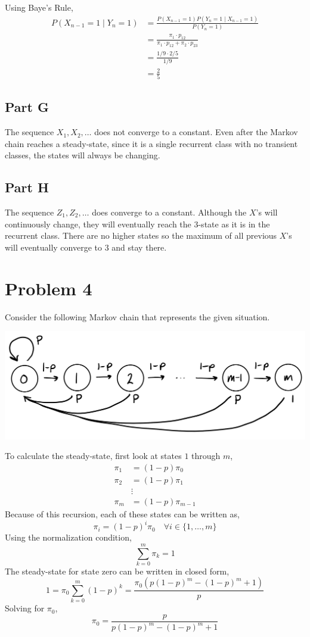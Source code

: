 \documentclass{article}
\begin{document}
Using Baye's Rule,
\begin{align*}
  P(X_{n - 1} = 1 \mid Y_n = 1) &= \frac{P(X_{n - 1} = 1) P(Y_n = 1 \mid X_{n
  - 1} = 1)}{P(Y_n = 1)} \\
  &= \frac{\pi_1 \cdot p_{12}}{\pi_1 \cdot p_{12} + \pi_2 \cdot p_{23}} \\
  &= \frac{1/9 \cdot 2/5}{1/9} \\
  &= \frac{2}{5}
\end{align*}

\subsection*{Part G}

The sequence $X_1, X_2, \ldots$ does not converge to a constant. Even after
the Markov chain reaches a steady-state, since it is a single recurrent class
with no transient classes, the states will always be changing.

\subsection*{Part H}

The sequence $Z_1, Z_2, \ldots$ does converge to a constant. Although the
$X$'s will continuously change, they will eventually reach the $3$-state as
it is in the recurrent class. There are no higher states so the maximum of
all previous $X$'s will eventually converge to $3$ and stay there.

\section*{Problem 4}

Consider the following Markov chain that represents the given situation.

\begin{center}
    \includegraphics[scale=0.25]{Images/P4.PNG}
\end{center}

To calculate the steady-state, first look at states $1$ through $m$,
\begin{align*}
  \pi_1 &= (1 - p) \pi_0 \\
  \pi_2 &= (1 - p) \pi_1 \\
  &\vdots \\
  \pi_m &= (1 - p) \pi_{m - 1}
\end{align*}
Because of this recursion, each of these states can be written as,
$$ \pi_i = (1 - p)^i \pi_0\quad \forall i \in \{1, \ldots, m\} $$
Using the normalization condition,
$$ \sum_{k=0}^{m} \pi_k = 1$$
The steady-state for state zero can be written in closed form,
$$ 1 = \pi_0 \sum_{k=0}^{m} (1 - p)^k = \frac{\pi_0 (p(1 - p)^m - (1 - p)^m +
1)}{p} $$
Solving for $\pi_0$,
$$ \pi_0 = \frac{p}{p(1 - p)^m - (1 - p)^m + 1} $$
\end{document}
